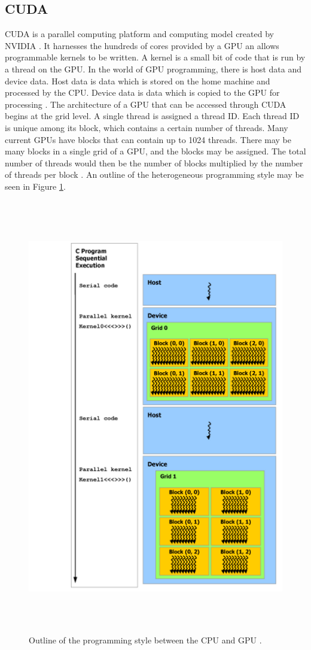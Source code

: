 \subsection{CUDA}
CUDA is a parallel computing platform and computing model created by NVIDIA \cite{cuda}. It harnesses the hundreds of cores provided by a GPU an allows programmable kernels to be written. A kernel is a small bit of code that is run by a thread on the GPU. In the world of GPU programming, there is host data and device data. Host data is data which is stored on the home machine and processed by the CPU. Device data is data which is copied to the GPU for processing \cite{cudabyexample}. The architecture of a GPU that can be accessed through CUDA begins at the grid level. A single thread is assigned a thread ID. Each thread ID is unique among its block, which contains a certain number of threads. Many current GPUs have blocks that can contain up to 1024 threads. There may be many blocks in a single grid of a GPU, and the blocks may be assigned. The total number of threads would then be the number of blocks multiplied by the number of threads per block \cite{cuda}. An outline of the heterogeneous programming style may be seen in Figure \ref{fig:cuda_arch}. 

\begin{figure}%
\centering
\includegraphics[height=7.5in]{figures/background/cuda_arch.png}
\caption{Outline of the programming style between the CPU and GPU \cite{cuda}.}
\label{fig:cuda_arch}
\end{figure}

